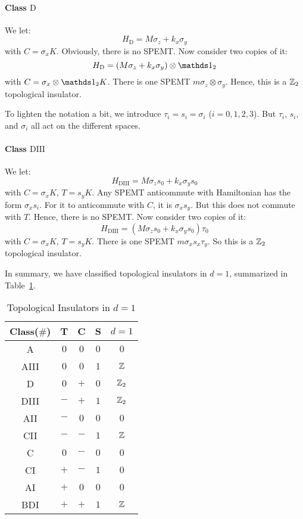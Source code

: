\documentclass{article}
\begin{document}
\paragraph{Class $\mathrm{D}$} We let:
\begin{equation}
    H_{\mathrm{D}} = M\sigma_z + k_x \sigma_y
\end{equation}
with $C=\sigma_x K$. Obviously, there is no SPEMT. Now consider two copies of
it:
\begin{equation}
    H_{\mathrm{D}} = (M\sigma_z + k_x \sigma_y)\otimes\id_2
\end{equation}
with $C=\sigma_x\otimes\id_2 K$. There is one SPEMT $m \sigma_z\otimes\sigma_y$.
Hence, this is a $\mathbb{Z}_2$ topological insulator.

To lighten the notation a bit, we introduce $\tau_i=s_i=\sigma_i$ ($i=0,1,2,3$).
But $\tau_i$, $s_i$, and $\sigma_i$ all act on the different spaces.
\paragraph{Class $\mathrm{DIII}$} We let:
\begin{equation}
    H_{\mathrm{DIII}} = M \sigma_z s_0 + k_x \sigma_y s_0
\end{equation}
with $C=\sigma_x K$, $T=s_y K$. Any SPEMT anticommute with Hamiltonian has the
form $\sigma_x s_i$. For it to anticommute with $C$, it is $\sigma_x s_y$. But
this does not commute with $T$. Hence, there is no SPEMT. Now consider two
copies of it:
\begin{equation}
    H_{\mathrm{DIII}} = (M \sigma_z s_0 + k_x \sigma_y s_0)\tau_0
\end{equation}
with $C=\sigma_x K$, $T=s_y K$.  There is one SPEMT $m \sigma_xs_x\tau_y$. So
this is a $\mathbb{Z}_2$ topological insulator.

In summary, we have classified topological insulators in $d=1$, summarized in
Table~\ref{tab:ti-d=1}.
\begin{table}[htpb]
    \centering
    \caption{Topological Insulators in $d=1$}
    \label{tab:ti-d=1}
    \begin{tabular}{c | c c c | c }
        Class($\#$) & T & C & S & $d=1$ \\
        \hline 
        A & $0$ & $0$ & $0$ & $0$ \\
        AIII & $0$ & $0$ & $1$ & $\mathbb{Z}$ \\
        \hline
        D & $0$ & $+$ & $0$ & $\mathbb{Z}_2$ \\
        DIII & $-$ & $+$ & $1$ & $\mathbb{Z}_2$ \\
        AII & $-$ & $0$ & $0$ & $0$ \\
        CII & $-$ & $-$ & $1$ & $\mathbb{Z}$ \\
        C & $0$ & $-$ & $0$ & $0$ \\
        CI & $+$ & $-$ & $1$ & $0$ \\
        AI & $+$ & $0$ & $0$ & $0$ \\
        BDI & $+$ & $+$ & $1$ & $\mathbb{Z}$ \\
        \hline
    \end{tabular}
\end{table}
\end{document}
